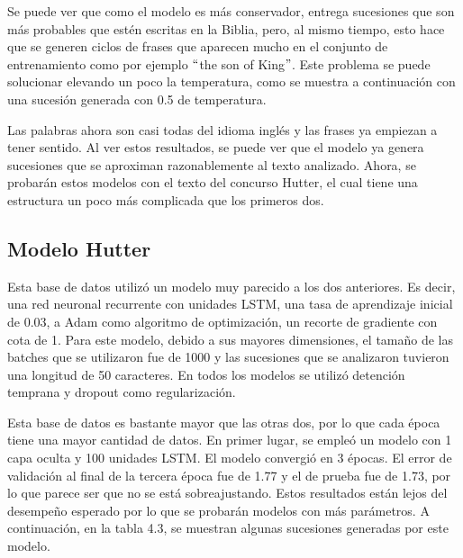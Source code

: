 \vspace{1em}

Se puede ver que como el modelo es más conservador, entrega sucesiones que son más probables que estén escritas en la Biblia, pero, al mismo tiempo, esto hace que se generen ciclos de frases que aparecen mucho en el conjunto de entrenamiento como por ejemplo $``$the son of King$"$. Este problema se puede solucionar elevando un poco la temperatura, como se muestra a continuación con una sucesión generada con 0.5 de temperatura.

\vspace{1em}

 
\vspace{1em}

Las palabras ahora son casi todas del idioma inglés y las frases ya empiezan a tener sentido. Al ver estos resultados, se puede ver que el modelo ya genera sucesiones que se aproximan razonablemente al texto analizado. Ahora, se probarán estos modelos con el texto del concurso Hutter, el cual tiene una estructura un poco más complicada que los primeros dos.

\subsection{Modelo Hutter}
Esta base de datos utilizó un modelo muy parecido a los dos anteriores. Es decir, una red neuronal recurrente con unidades LSTM, una tasa de aprendizaje inicial de 0.03, a Adam como algoritmo de optimización, un recorte de gradiente con cota de 1. Para este modelo, debido a sus mayores dimensiones, el tamaño de las batches que se utilizaron fue de 1000 y las sucesiones que se analizaron tuvieron una longitud de 50 caracteres. En todos los modelos se utilizó detención temprana y dropout como regularización.

\vspace{1em}

Esta base de datos es bastante mayor que las otras dos, por lo que cada época tiene una mayor cantidad de datos. En primer lugar, se empleó un modelo con 1 capa oculta y 100 unidades LSTM. El modelo convergió en 3 épocas. El error de validación al final de la tercera época fue de 1.77 y el de prueba fue de 1.73, por lo que parece ser que no se está sobreajustando. Estos resultados están lejos del desempeño esperado por lo que se probarán modelos con más parámetros. A continuación, en la tabla 4.3, se muestran algunas sucesiones generadas por este modelo. 

